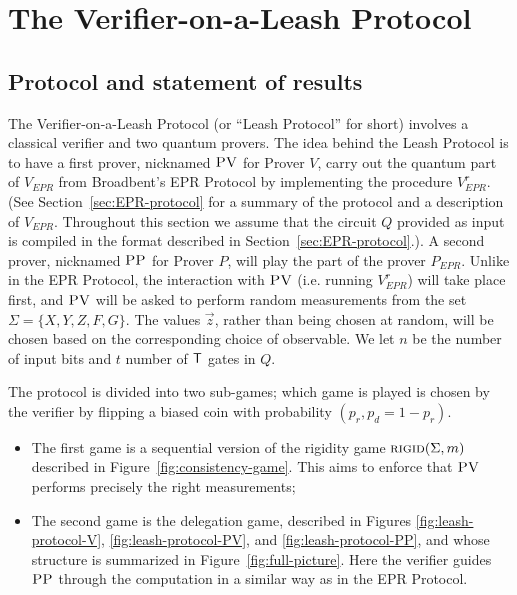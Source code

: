 


\section{The Verifier-on-a-Leash Protocol}
\label{sec:leash}




\subsection{Protocol and statement of results}

The Verifier-on-a-Leash Protocol (or ``Leash Protocol'' for short) involves a classical verifier and two quantum provers.
The idea behind the Leash Protocol is to have a first prover, nicknamed $\textsc{PV}$ for Prover $V$, carry out the quantum part of $V_{EPR}$ from Broadbent's EPR Protocol by implementing the procedure $V_{EPR}^r$. (See Section~\ref{sec:EPR-protocol} for a summary of the protocol and a description of $V_{EPR}$. Throughout this section we assume that the circuit $Q$ provided as input is compiled in the format described in Section~\ref{sec:EPR-protocol}.). A second prover, nicknamed $\textsc{PP}$ for Prover $P$, will play the part of the prover $P_{EPR}$. Unlike in the EPR Protocol, the interaction with $\textsc{PV}$ (i.e. running $V_{EPR}^r$) will take place {first}, and $\textsc{PV}$ will be asked to perform {random} measurements from the set $\Sigma = \{X,Y,Z,F,G\}$. The values $\vec{z}$, rather than being chosen at random, will be chosen based on the corresponding choice of observable. We let $n$ be the number of input bits and $t$ number of $\sf T$ gates in $Q$. 

The protocol is divided into two sub-games; which game is played is chosen by the verifier by flipping a biased coin with probability $(p_r,p_d=1-p_r)$.
\begin{itemize}[nolistsep]
\item The first game is a sequential version of the rigidity game $\textsc{rigid}(\Sigma,m)$ described in Figure~\ref{fig:consistency-game}. This aims to enforce that $\textsc{PV}$ performs precisely the right measurements;

\item The second game is the delegation game, described in Figures \ref{fig:leash-protocol-V}, \ref{fig:leash-protocol-PV}, and \ref{fig:leash-protocol-PP}, and whose structure is summarized in Figure~\ref{fig:full-picture}. Here the verifier guides $\textsc{PP}$ through the computation in a similar way as in the EPR Protocol.
\end{itemize}

